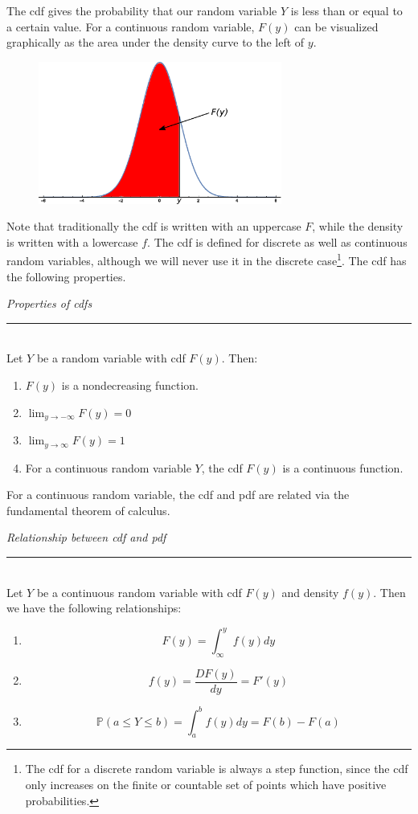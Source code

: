 \documentclass[12pt]{article}
\theoremstyle{definition}
\theoremstyle{remark}
\def\P{{\mathbb P}}
\begin{document}
The cdf gives the probability that our random variable $Y$ is less than or equal to a certain value. For a continuous random variable, $F(y)$ can be visualized graphically as the area under the density curve to the left of $y$.

\begin{figure}[H]
\centering
\includegraphics[width=8cm]{normalcdf.eps}
\end{figure}

Note that traditionally the cdf is written with an uppercase $F$, while the density is written with a lowercase $f$.
The cdf is defined for discrete as well as continuous random variables, although we will never use it in the discrete case\footnote{The cdf for a discrete random variable is always a step function, since the cdf only increases on the finite or countable set of points which have positive probabilities.}. The cdf has the following properties.

\begin{framed}
\emph{Properties of cdfs}\\
  \rule{\dimexpr{}\fboxrule}{.1pt} \\
Let $Y$ be a random variable with cdf $F(y)$. Then:
\begin{enumerate}
\item $F(y)$ is a nondecreasing function.
\item $\lim_{y \rightarrow -\infty} F(y) = 0$
\item $\lim_{y \rightarrow \infty} F(y) = 1$
\item For a continuous random variable $Y$, the cdf $F(y)$ is a continuous function.
\end{enumerate}
\end{framed}

For a continuous random variable, the cdf and pdf are related via the fundamental theorem of calculus. 

\begin{framed}
\emph{Relationship between cdf and pdf}\\
  \rule{\dimexpr{}\fboxrule}{.1pt} \\
Let $Y$ be a continuous random variable with cdf $F(y)$ and density $f(y)$. Then we have the following relationships:
\begin{enumerate}
\item 
\[
F(y) = \int_{\infty}^y f(y) dy
\]

\item
\[
f(y) = \frac{DF(y)}{dy} = F'(y)
\]
\item
\[
\P(a \leq Y \leq b) = \int_a^b f(y) dy = F(b) - F(a)
\]
\end{enumerate}
\end{framed}
\end{document}
